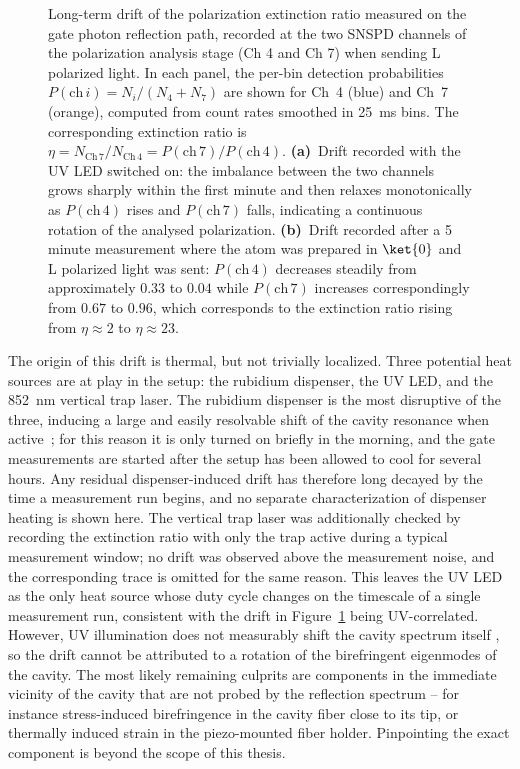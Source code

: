 \begin{figure}[htpb]
	\centering
	
	\caption{Long-term drift of the polarization extinction ratio measured on the gate photon reflection path, recorded at the two SNSPD channels of the polarization analysis stage (Ch 4 and Ch 7) when sending L polarized light. In each panel, the per-bin detection probabilities $P(\mathrm{ch}\,i) = N_i / (N_4 + N_7)$ are shown for Ch~4 (blue) and Ch~7 (orange), computed from count rates smoothed in \SI{25}{\milli\second} bins. The corresponding extinction ratio is $\eta = N_{\mathrm{Ch}\,7}/N_{\mathrm{Ch}\,4} = P(\mathrm{ch}\,7)/P(\mathrm{ch}\,4)$. \textbf{(a)}~Drift recorded with the UV LED switched on: the imbalance between the two channels grows sharply within the first minute and then relaxes monotonically as $P(\mathrm{ch}\,4)$ rises and $P(\mathrm{ch}\,7)$ falls, indicating a continuous rotation of the analysed polarization. \textbf{(b)}~Drift recorded after a 5 minute measurement where the atom was prepared in $\ket{0}$ and L polarized light was sent: $P(\mathrm{ch}\,4)$ decreases steadily from approximately $0.33$ to $0.04$ while $P(\mathrm{ch}\,7)$ increases correspondingly from $0.67$ to $0.96$, which corresponds to the extinction ratio rising from $\eta \approx 2$ to $\eta \approx 23$.}
	\label{fig:extinction_drift}
\end{figure}

The origin of this drift is thermal, but not trivially localized. Three potential heat sources are at play in the setup: the rubidium dispenser, the UV LED, and the \SI{852}{\nano\metre} vertical trap laser. The rubidium dispenser is the most disruptive of the three, inducing a large and easily resolvable shift of the cavity resonance when active~\cite{GianvitoC2026}; for this reason it is only turned on briefly in the morning, and the gate measurements are started after the setup has been allowed to cool for several hours. Any residual dispenser-induced drift has therefore long decayed by the time a measurement run begins, and no separate characterization of dispenser heating is shown here. The vertical trap laser was additionally checked by recording the extinction ratio with only the trap active during a typical measurement window; no drift was observed above the measurement noise, and the corresponding trace is omitted for the same reason. This leaves the UV LED as the only heat source whose duty cycle changes on the timescale of a single measurement run, consistent with the drift in Figure~\ref{fig:extinction_drift} being UV-correlated. However, UV illumination does not measurably shift the cavity spectrum itself \cite{GianvitoC2026}, so the drift cannot be attributed to a rotation of the birefringent eigenmodes of the cavity. The most likely remaining culprits are components in the immediate vicinity of the cavity that are not probed by the reflection spectrum -- for instance stress-induced birefringence in the cavity fiber close to its tip, or thermally induced strain in the piezo-mounted fiber holder. Pinpointing the exact component is beyond the scope of this thesis.


